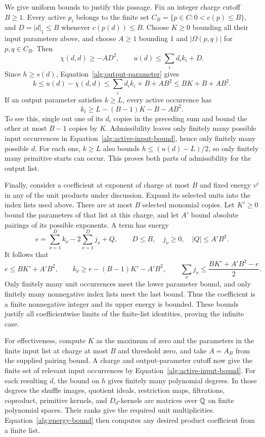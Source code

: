 We give uniform bounds to justify this passage.  Fix an integer
charge cutoff $B\ge1$.  Every active $p_i$ belongs to the finite set
$C_B=\{p\in C:0<c(p)\le B\}$, and
$D=|d|_1\le B$ whenever $c(p(d))\le B$.  Choose $K\ge0$ bounding
all their input parameters above, and choose $A\ge1$ bounding
$1$ and $|\Omega(p,q)|$ for $p,q\in C_B$.  Then
\[
 \chi(d,d)\ge-AD^2,\qquad
 u(d)\le\sum_i d_ik_i+D.
\]
Since $h\ge s(d)$, Equation~\eqref{alg:output-parameter} gives
\begin{equation}\label{alg:parameter-bound}
 k\le u(d)-\chi(d,d)
       \le\sum_i d_ik_i+B+AB^2
       \le BK+B+AB^2.
\end{equation}
If an output parameter satisfies $k\ge L$, every active occurrence
has
\begin{equation}\label{alg:active-input-bound}
 k_i\ge L-(B-1)K-B-AB^2.
\end{equation}
To see this, single out one of its $d_i$ copies in the preceding
sum and bound the other at most $B-1$ copies by $K$.  Admissibility
leaves only finitely many possible input occurrences in
Equation~\eqref{alg:active-input-bound}, hence only finitely many
possible $d$.  For each one, $k\ge L$ also bounds
$h\le(u(d)-L)/2$, so only finitely many primitive starts can occur.
This proves both parts of admissibility for the output list.

Finally, consider a coefficient at exponent of charge at most $B$
and fixed energy $v^e$ in any of the unit products under discussion.
Expand its selected units into the index lists used above.  There
are at most $B$ selected monomial copies.  Let $K'\ge0$ bound the
parameters of that list at this charge, and let $A'$ bound absolute
pairings of its possible exponents.  A term has energy
\begin{equation}\label{alg:energy-bound}
 e=\sum_{\nu=1}^{D}k_\nu-2\sum_{\nu=1}^{D}j_\nu+Q,
 \qquad D\le B,\quad j_\nu\ge0,\quad |Q|\le A'B^2.
\end{equation}
It follows that
\[
 e\le BK'+A'B^2,\qquad
 k_\nu\ge e-(B-1)K'-A'B^2,
 \qquad
 \sum_\nu j_\nu\le\frac{BK'+A'B^2-e}{2}.
\]
Only finitely many unit occurrences meet the lower parameter bound,
and only finitely many nonnegative index lists meet the last bound.
Thus the coefficient is a finite nonnegative integer and its upper
energy is bounded.  These bounds justify all coefficientwise limits
of the finite-list identities, proving the infinite case.

For effectiveness, compute $K$ as the maximum of zero and the parameters
in the finite input list at charge at most $B$ and threshold zero, and
take $A=A_B$ from the supplied pairing bound.  A charge and
output-parameter cutoff now give the finite set of relevant input occurrences by
Equation~\eqref{alg:active-input-bound}.  For each resulting $d$,
the bound on $h$ gives finitely many polynomial degrees.  In those
degrees the shuffle images, quotient ideals, restriction maps,
filtrations, coproduct, primitive kernels, and $D_d$-kernels are
matrices over $\mathbb Q$ on finite polynomial spaces.  Their ranks give
the required unit multiplicities.  Equation~\eqref{alg:energy-bound}
then computes any desired product coefficient from a finite list.

